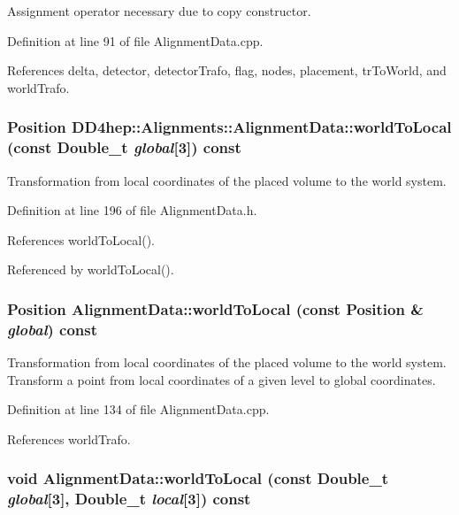 Assignment operator necessary due to copy constructor. 

Definition at line 91 of file AlignmentData.cpp.

References delta, detector, detectorTrafo, flag, nodes, placement, trToWorld, and worldTrafo.\hypertarget{class_d_d4hep_1_1_alignments_1_1_alignment_data_af1900a9bf83d09f6719fa698d9db4f52}{
\subsubsection[{worldToLocal}]{\setlength{\rightskip}{0pt plus 5cm}Position DD4hep::Alignments::AlignmentData::worldToLocal (const Double\_\-t {\em global}\mbox{[}3\mbox{]}) const}}
\label{class_d_d4hep_1_1_alignments_1_1_alignment_data_af1900a9bf83d09f6719fa698d9db4f52}


Transformation from local coordinates of the placed volume to the world system. 

Definition at line 196 of file AlignmentData.h.

References worldToLocal().

Referenced by worldToLocal().\hypertarget{class_d_d4hep_1_1_alignments_1_1_alignment_data_af0dad9165c3564024d6f61cd54209efd}{
\subsubsection[{worldToLocal}]{\setlength{\rightskip}{0pt plus 5cm}Position AlignmentData::worldToLocal (const Position \& {\em global}) const}}
\label{class_d_d4hep_1_1_alignments_1_1_alignment_data_af0dad9165c3564024d6f61cd54209efd}


Transformation from local coordinates of the placed volume to the world system. Transform a point from local coordinates of a given level to global coordinates. 

Definition at line 134 of file AlignmentData.cpp.

References worldTrafo.\hypertarget{class_d_d4hep_1_1_alignments_1_1_alignment_data_aebb62803c8bd116274744701317271a5}{
\subsubsection[{worldToLocal}]{\setlength{\rightskip}{0pt plus 5cm}void AlignmentData::worldToLocal (const Double\_\-t {\em global}\mbox{[}3\mbox{]}, \/  Double\_\-t {\em local}\mbox{[}3\mbox{]}) const}}
\label{class_d_d4hep_1_1_alignments_1_1_alignment_data_aebb62803c8bd116274744701317271a5}


